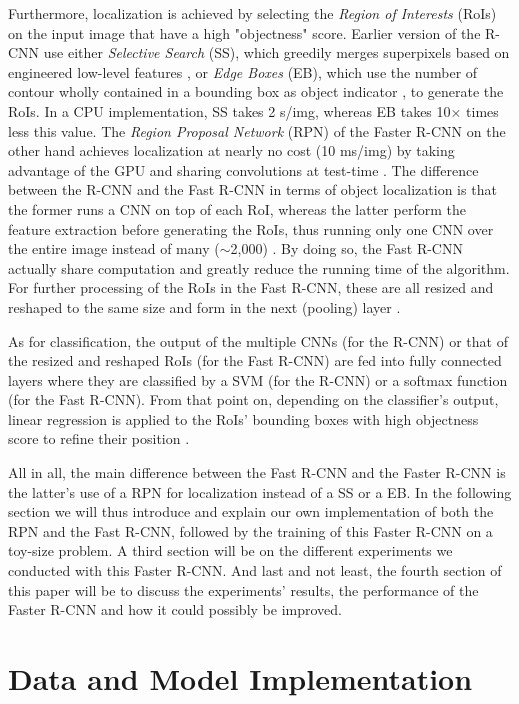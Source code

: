 \documentclass[a4paper]{article}
\begin{document}
Furthermore, localization is achieved by selecting the \emph{Region of Interests} (RoIs) on the input image that have a high "objectness" score. Earlier version of the R-CNN use either \emph{Selective Search} (SS), which greedily merges superpixels based on engineered low-level features \cite{ss}, or \emph{Edge Boxes} (EB), which use the number of contour wholly contained in a bounding box as object indicator \cite{eb}, to generate the RoIs. In a CPU implementation, SS takes 2 s/img, whereas EB takes 10$\times$ times less this value. The \emph{Region Proposal Network} (RPN) of the Faster R-CNN on the other hand achieves localization at nearly no cost (10 ms/img) by taking advantage of the GPU and sharing convolutions at test-time \cite{fasterrcnn}. The difference between the R-CNN and the Fast R-CNN in terms of object localization is that the former runs a CNN on top of each RoI, whereas the latter perform the feature extraction before generating the RoIs, thus running only one CNN over the entire image instead of many ($\sim$2,000) \cite{fastrcnn}. By doing so, the Fast R-CNN actually share computation and greatly reduce the running time of the algorithm. For further processing of the RoIs in the Fast R-CNN, these are all resized and reshaped to the same size and form in the next (pooling) layer \cite{fastrcnn}.

As for classification, the output of the multiple CNNs (for the R-CNN) or that of the resized and reshaped RoIs (for the Fast R-CNN) are fed into fully connected layers where they are classified by a SVM (for the R-CNN) or a softmax function (for the Fast R-CNN). From that point on, depending on the classifier's output, linear regression is applied to the RoIs' bounding boxes with high objectness score to refine their position \cite{fastrcnn}.

All in all, the main difference between the Fast R-CNN and the Faster R-CNN is the latter's use of a RPN for localization instead of a SS or a EB. In the following section we will thus introduce and explain our own implementation of both the RPN and the Fast R-CNN, followed by the training of this Faster R-CNN on a toy-size problem. A third section will be on the different experiments we conducted with this Faster R-CNN. And last and not least, the fourth section of this paper will be to discuss the experiments' results, the performance of the Faster R-CNN and how it could possibly be improved.

\section{Data and Model Implementation}
\end{document}
